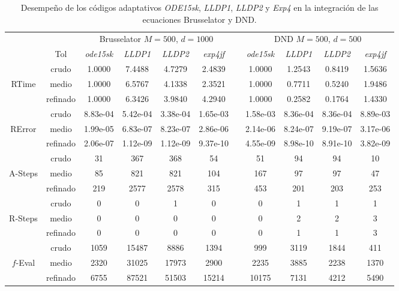 \begin{table}[htb]
	\caption{Desempeño de los códigos adaptativos \emph{ODE15sk}, \emph{LLDP1}, \emph{LLDP2} y \emph{Exp4} en la integración de las ecuaciones Brusselator y DND.}
	\label{tab:brussdnd}
	\begin{adjustbox}{width=0.95\columnwidth,center}
		\begin{tabular}{ccccccccccc}
			\hline
			&  & \multicolumn{4}{c}{Brusselator $M=500$, $d=1000$} &  & \multicolumn{4}{c}{DND $M=500$, $d=500$} \\
			\cline{3-6}\cline{8-11} & Tol & \emph{ode15sk} & \emph{LLDP1} & \emph{LLDP2} & \emph{exp4jf} &  & \emph{ode15sk} & \emph{LLDP1} & \emph{LLDP2} & \emph{exp4jf} \\
			\hline
			& crudo & 1.0000 & 7.4488 & 4.7279 & 2.4839 &  & 1.0000 & 1.2543 & 0.8419 & 1.5636 \\
			RTime & medio & 1.0000 & 6.5767 & 4.1338 & 2.3521 &  & 1.0000 & 0.7711 & 0.5240 & 1.9486 \\
			& refinado & 1.0000 & 6.3426 & 3.9840 & 4.2940 &  & 1.0000 & 0.2582 & 0.1764 & 1.4330 \\
			\hline
			& crudo & 8.83e-04 & 5.42e-04 & 3.38e-04 & 1.65e-03 &  & 1.58e-03 & 8.36e-04 & 8.36e-04 & 8.89e-03 \\
			RError & medio & 1.99e-05 & 6.83e-07 & 8.23e-07 & 2.86e-06 &  & 2.14e-06 & 8.24e-07 & 9.19e-07 & 3.17e-06 \\
			& refinado & 2.06e-07 & 1.12e-09 & 1.12e-09 & 9.37e-10 &  & 4.55e-09 & 8.98e-10 & 8.91e-10 & 3.82e-09 \\
			\hline
			& crudo & 31 & 367 & 368 & 54 &  & 51 & 94 & 94 & 10 \\
			A-Steps & medio & 85 & 821 & 821 & 104 &  & 167 & 97 & 97 & 47 \\
			& refinado & 219 & 2577 & 2578 & 315 &  & 453 & 201 & 203 & 253 \\
			\hline
			& crudo & 0 & 0 & 1 & 0 &  & 0 & 1 & 1 & 1 \\
			R-Steps & medio & 0 & 0 & 0 & 0 &  & 0 & 2 & 2 & 3 \\
			& refinado & 0 & 0 & 0 & 0 &  & 0 & 1 & 1 & 3 \\
			\hline
			& crudo & 1059 & 15487 & 8886 & 1394 &  & 999 & 3119 & 1844 & 411 \\
			$f$-Eval & medio & 2320 & 31025 & 17973 & 2900 &  & 2235 & 3885 & 2238 & 1370 \\
			& refinado & 6755 & 87521 & 51503 & 15214 &  & 10175 & 7131 & 4212 & 5490 \\

\end{tabular}
\end{adjustbox}
\end{table}
